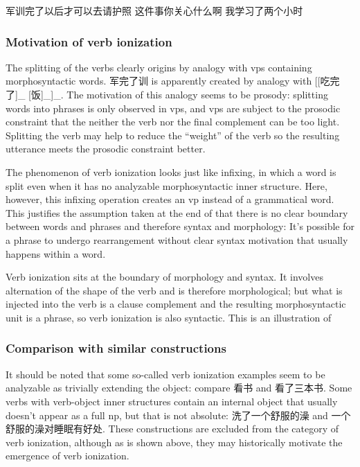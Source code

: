 \documentclass[UTF8, a4paper, oneside, scheme=plain, 12pt]{ctexrep}
\begin{document}
\begin{exe}
    \ex\label{ex:verb-phrase.separation.junxun-2} 军训完了以后才可以去请护照
    \ex\label{ex:verb-phrase.separation.guanxin-2} 这件事你关心什么啊
    \ex\label{ex:verb-phrase.separation.xuexi-2} 我学习了两个小时
\end{exe}

\subsubsection{Motivation of verb ionization}

The splitting of the verbs clearly origins 
by analogy with \ac{vp}s containing morphosyntactic words.
军完了训 is apparently created by analogy with 
[[吃完了]_{} [饭]_{}]_{}.
The motivation of this analogy seems to be prosody: 
splitting words into phrases is only observed in \ac{vp}s,
and \ac{vp}s are subject to the prosodic constraint 
that the neither the verb nor the final complement can be too light.
Splitting the verb may help to reduce the ``weight'' of the verb 
so the resulting utterance meets the prosodic constraint better.

The phenomenon of verb ionization
looks just like infixing,
in which a word is split even when it has no analyzable morphosyntactic inner structure.
Here, however, this infixing operation creates an \acs{vp} instead of a grammatical word.
This justifies the assumption taken at the end of 
that there is no clear boundary between words and phrases 
and therefore syntax and morphology:
It's possible for a phrase to undergo 
rearrangement without clear syntax motivation
that usually happens within a word.

Verb ionization sits at the boundary of morphology and syntax.
It involves alternation of the shape of the verb 
and is therefore morphological; 
but what is injected into the verb is a clause complement  
and the resulting morphosyntactic unit is a phrase,
so verb ionization is also syntactic. 
This is an illustration of 

\subsubsection{Comparison with similar constructions}\label{sec:verb-phrase.ionization.similar}

It should be noted that some so-called verb ionization examples 
seem to be analyzable as 
trivially extending the object: 
compare 看书 and 看了三本书.
Some verbs with verb-object inner structures 
contain an internal object that usually doesn't appear as a full \acs{np}, 
but that is not absolute: 
洗了一个舒服的澡 and 一个舒服的澡对睡眠有好处.
These constructions are excluded from the category of verb ionization,
although as is shown above, 
they may historically motivate the emergence of verb ionization.
\end{document}
